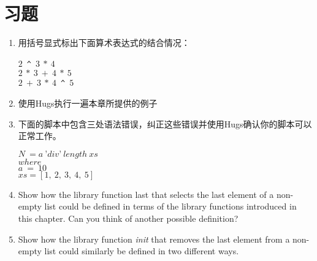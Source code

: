 \section{习题}

\begin{enumerate}
\item 用括号显式标出下面算术表达式的结合情况：

\noindent\hspace*{1cm} $2$~\verb|^|~$3~*~4$\\
\hspace*{1cm} $2~*~3~+~4~*~5$\\
\hspace*{1cm} $2~+~3~*~4$~\verb|^|~$5$

\item 使用Hugs执行一遍本章所提供的例子

\item
下面的脚本中包含三处语法错误，纠正这些错误并使用Hugs确认你的脚本可以正常工作。

\noindent\hspace*{1cm} $N~ = a~’div’~length~xs$\\
\hspace*{2cm} $       where$\\
\hspace*{3cm} $          a~=~10$\\
\hspace*{2.5cm} $        xs = [1,~2,~3,~4,~5]$

\item Show how the library function last that selects the last element of a
non-empty list could be defined in terms of the library functions introduced
in this chapter. Can you think of another possible definition?

\item Show how the library function \textit{init} that removes the last element from a
non-empty list could similarly be defined in two different ways.
\end{enumerate}
